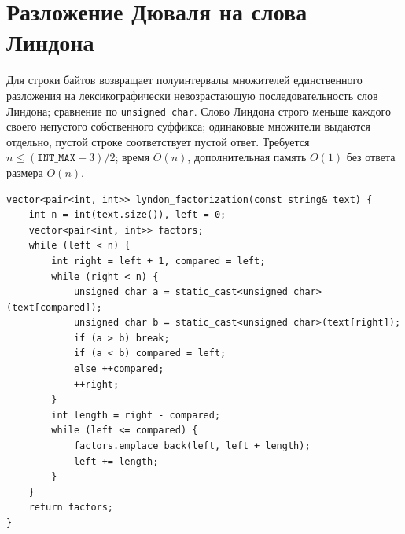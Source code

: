 \section{Разложение Дюваля на слова Линдона}
Для строки байтов возвращает полуинтервалы множителей единственного разложения на лексикографически невозрастающую последовательность слов Линдона; сравнение по \texttt{unsigned char}.
Слово Линдона строго меньше каждого своего непустого собственного суффикса; одинаковые множители выдаются отдельно, пустой строке соответствует пустой ответ.
Требуется $n\le(\texttt{INT\_MAX}-3)/2$; время $O(n)$, дополнительная память $O(1)$ без ответа размера $O(n)$.
\begin{lstlisting}[name=extra_string_duval]
vector<pair<int, int>> lyndon_factorization(const string& text) {
    int n = int(text.size()), left = 0;
    vector<pair<int, int>> factors;
    while (left < n) {
        int right = left + 1, compared = left;
        while (right < n) {
            unsigned char a = static_cast<unsigned char>(text[compared]);
            unsigned char b = static_cast<unsigned char>(text[right]);
            if (a > b) break;
            if (a < b) compared = left;
            else ++compared;
            ++right;
        }
        int length = right - compared;
        while (left <= compared) {
            factors.emplace_back(left, left + length);
            left += length;
        }
    }
    return factors;
}
\end{lstlisting}
%

\fi
